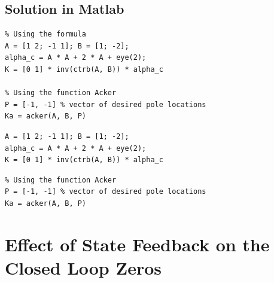 \subsection*{Solution in Matlab} %
\label{sub:solution_in_matlab}
\begin{verbatim}
% Using the formula
A = [1 2; -1 1]; B = [1; -2];
alpha_c = A * A + 2 * A + eye(2);
K = [0 1] * inv(ctrb(A, B)) * alpha_c

% Using the function Acker
P = [-1, -1] % vector of desired pole locations
Ka = acker(A, B, P)
\end{verbatim}
\ifslidesonly
\begin{slide}
\begin{verbatim}
A = [1 2; -1 1]; B = [1; -2];
alpha_c = A * A + 2 * A + eye(2);
K = [0 1] * inv(ctrb(A, B)) * alpha_c
\end{verbatim}
\end{slide}
\begin{slide}
\begin{verbatim}
% Using the function Acker
P = [-1, -1] % vector of desired pole locations
Ka = acker(A, B, P)
\end{verbatim}
\end{slide}
\fi 


 


 


\section*{Effect of State Feedback on the Closed Loop Zeros} %
\label{sec:effect_of_state_feedback_on_the_closed_loop_zeros}


\ifslidesonly
\begin{slide}
   
\end{slide}
\fi




\ifslidesonly
\begin{slide}
   
\end{slide}
\fi


\ifslidesonly
\begin{slide}
   
\end{slide}
\fi


